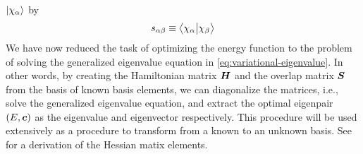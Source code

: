             $\ket{\chi_{\alpha}}$ by
            \begin{align}
                s_{\alpha\beta}
                \equiv
                \braket{\chi_{\alpha}}{\chi_{\beta}}
            \end{align}
            We have now reduced the task of optimizing the energy function to
            the problem of solving the generalized eigenvalue equation in
            \autoref{eq:variational-eigenvalue}.
            In other words, by creating the Hamiltonian matrix $\boldsymbol{H}$ and
            the overlap matrix $\boldsymbol{S}$ from the basis of known basis
            elements, we can diagonalize the matrices, i.e., solve the
            generalized eigenvalue equation, and extract the optimal eigenpair
            $(E, \boldsymbol{c})$ as the eigenvalue and eigenvector respectively.
            This procedure will be used extensively as a procedure to transform
            from a known to an unknown basis.
            See  \cite{helgaker-molecular} for a
            derivation of the Hessian matix elements.

